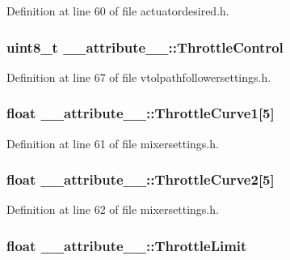 \-Definition at line 60 of file actuatordesired.\-h.

\hypertarget{struct____attribute_____a42d632eab7a71f9666a81dfb4bc463e5}{
\subsubsection[{\-Throttle\-Control}]{\setlength{\rightskip}{0pt plus 5cm}uint8\-\_\-t {\bf \-\_\-\-\_\-attribute\-\_\-\-\_\-\-::\-Throttle\-Control}}}\label{struct____attribute_____a42d632eab7a71f9666a81dfb4bc463e5}


\-Definition at line 67 of file vtolpathfollowersettings.\-h.

\hypertarget{struct____attribute_____a7f91d63c4c8032255a3484b028034ca9}{
\subsubsection[{\-Throttle\-Curve1}]{\setlength{\rightskip}{0pt plus 5cm}float {\bf \-\_\-\-\_\-attribute\-\_\-\-\_\-\-::\-Throttle\-Curve1}\mbox{[}5\mbox{]}}}\label{struct____attribute_____a7f91d63c4c8032255a3484b028034ca9}


\-Definition at line 61 of file mixersettings.\-h.

\hypertarget{struct____attribute_____afae1724abb34e678d7edb4909713fbd0}{
\subsubsection[{\-Throttle\-Curve2}]{\setlength{\rightskip}{0pt plus 5cm}float {\bf \-\_\-\-\_\-attribute\-\_\-\-\_\-\-::\-Throttle\-Curve2}\mbox{[}5\mbox{]}}}\label{struct____attribute_____afae1724abb34e678d7edb4909713fbd0}


\-Definition at line 62 of file mixersettings.\-h.

\hypertarget{struct____attribute_____a1bce105aa91fc080bf5f1b1e75f5751b}{
\subsubsection[{\-Throttle\-Limit}]{\setlength{\rightskip}{0pt plus 5cm}float {\bf \-\_\-\-\_\-attribute\-\_\-\-\_\-\-::\-Throttle\-Limit}}}\label{struct____attribute_____a1bce105aa91fc080bf5f1b1e75f5751b}


